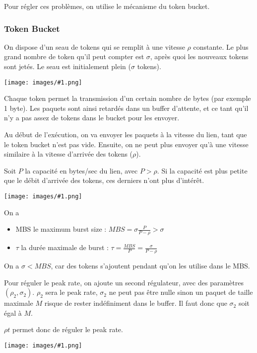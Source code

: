 \documentclass[10pt,a4paper]{report}
\newcommand{\dessin}[1]{\begin{center}\texttt{[image: images/\#1.png]}\end{center}}
\begin{document}
			Pour régler ces problèmes, on utilise le mécanisme du token bucket.
			
			\subsubsection{Token Bucket}
			
			On dispose d'un seau de tokens qui se remplit à une vitesse $\rho$ constante. Le plus grand nombre de token qu'il peut compter est $\sigma$, après quoi les nouveaux tokens sont jetés. Le seau est initialement plein ($\sigma$ tokens).
			
			\dessin{104}
			
			Chaque token permet la transmission d'un certain nombre de bytes (par exemple 1 byte). Les paquets sont ainsi retardés dans un buffer d'attente, et ce tant qu'il n'y a pas assez de tokens dans le bucket pour les envoyer.
		
			
			Au début de l'exécution, on va envoyer les paquets à la vitesse du lien, tant que le token bucket n'est pas vide. Ensuite, on ne peut plus envoyer qu'à une vitesse similaire à la vitesse d'arrivée des tokens ($\rho$).
			
			Soit $P$ la capacité en bytes/sec du lien, avec $P > \rho$. Si la capacité est plus petite que le débit d'arrivée des tokens, ces derniers n'ont plus d'intérêt.
			
			\dessin{105}
			
			On a 
			
			\begin{itemize}
				\item MBS le maximum burst size : $MBS = \sigma \frac{P}{P - \rho} > \sigma$
				\item $\tau$ la durée maximale de burst : $\tau = \frac{MBS}{P} = \frac{\sigma}{P - \rho}$
			\end{itemize}
			
			On a $\sigma < MBS$, car des tokens s'ajoutent pendant qu'on les utilise dans le MBS.
			
			
			Pour réguler le peak rate, on ajoute un second régulateur, avec des paramètres $(\rho_2, \sigma_2)$. $\rho_2$ sera le peak rate, $\sigma_2$ ne peut pas être nulle sinon un paquet de taille maximale $M$ risque de rester indéfiniment dans le buffer. Il faut donc que $\sigma_2$ soit égal à $M$.
			
			$\rho t$ permet donc de réguler le peak rate.			
		
			\dessin{106}
			
\end{document}
